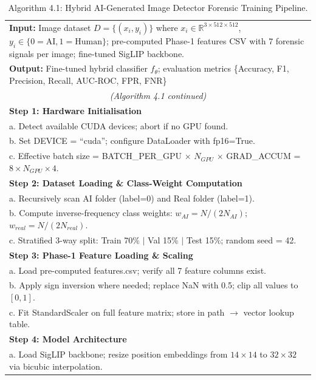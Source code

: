 \renewcommand{\arraystretch}{1.3}
\begin{longtable}{|p{}|}
\caption{Algorithm 4.1: Hybrid AI-Generated Image Detector Forensic Training Pipeline.}
\label{alg:training} \\
\hline
\small
\textbf{Input:} Image dataset $D = \{(x_i, y_i)\}$ where $x_i \in \mathbb{R}^{3 \times 512 \times 512}$, $y_i \in \{0=\text{AI}, 1=\text{Human}\}$; pre-computed Phase-1 features CSV with 7 forensic signals per image; fine-tuned SigLIP backbone. \\
\textbf{Output:} Fine-tuned hybrid classifier $f_\theta$; evaluation metrics \{Accuracy, F1, Precision, Recall, AUC-ROC, FPR, FNR\} \\
\hline
\endfirsthead
\hline
\multicolumn{1}{|c|}{\small\itshape (Algorithm 4.1 continued)} \\
\hline
\endhead
\hline
\endfoot
\hline
\endlastfoot
\small
\textbf{Step 1: Hardware Initialisation} \\
\quad a. Detect available CUDA devices; abort if no GPU found. \\
\quad b. Set DEVICE = ``cuda''; configure DataLoader with fp16=True. \\
\quad c. Effective batch size = BATCH\_PER\_GPU $\times$ $N_{GPU}$ $\times$ GRAD\_ACCUM = $8 \times N_{GPU} \times 4$. \\
\hline
\small\textbf{Step 2: Dataset Loading \& Class-Weight Computation} \\
\quad a. Recursively scan AI folder (label=0) and Real folder (label=1). \\
\quad b. Compute inverse-frequency class weights: $w_{AI} = N / (2 N_{AI})$; $w_{real} = N / (2 N_{real})$. \\
\quad c. Stratified 3-way split: Train 70\% $|$ Val 15\% $|$ Test 15\%; random seed = 42. \\
\hline
\small\textbf{Step 3: Phase-1 Feature Loading \& Scaling} \\
\quad a. Load pre-computed features.csv; verify all 7 feature columns exist. \\
\quad b. Apply sign inversion where needed; replace NaN with 0.5; clip all values to $[0, 1]$. \\
\quad c. Fit StandardScaler on full feature matrix; store in path $\rightarrow$ vector lookup table. \\
\hline
\small\textbf{Step 4: Model Architecture} \\
\quad a. Load SigLIP backbone; resize position embeddings from $14 \times 14$ to $32 \times 32$ via bicubic interpolation. \\

\end{longtable}
